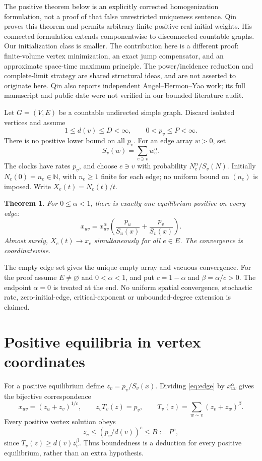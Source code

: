 \documentclass[11pt,a4paper]{article}
\newtheorem{theorem}{Theorem}
\newcommand{\N}{\mathbb N}
\newcommand{\Tv}{T_v}
\begin{document}
The positive theorem below is an explicitly corrected homogenization
formulation, not a proof of that false unrestricted uniqueness sentence.
Qin~\cite[Theorem 1.1]{Qin} proves this theorem and permits arbitrary finite
positive real initial weights. His connected formulation extends componentwise
to disconnected countable graphs. Our initialization class is smaller.
The contribution here is a different proof: finite-volume vertex minimization,
an exact jump compensator, and an approximate space-time maximum principle.
The power/incidence reduction and complete-limit strategy are shared structural
ideas, and are not asserted to originate here. Qin also reports independent
Angel--Hermon--Yao work; its full manuscript and public date were not verified
in our bounded literature audit.

Let $G=(V,E)$ be a countable undirected simple graph. Discard isolated vertices
and assume
\[
 1\leq d(v)\leq D<\infty,\qquad 0<p_v\leq P<\infty.
\]
There is no positive lower bound on all $p_v$. For an edge array $w>0$, set
\[
 S_v(w)=\sum_{e\ni v}w_e^\alpha.
\]
The clocks have rates $p_v$, and choose $e\ni v$ with probability
$N_e^\alpha/S_v(N)$. Initially $N_e(0)=n_e\in\N$, with $n_e\geq1$ finite for
each edge; no uniform bound on $(n_e)$ is imposed. Write $X_e(t)=N_e(t)/t$.

\begin{theorem}\label{thm:main}
For $0\leq\alpha<1$, there is exactly one equilibrium positive on every edge:
\begin{equation}\label{eq:edge}
 x_{uv}=x_{uv}^{\alpha}
 \left(\frac{p_u}{S_u(x)}+\frac{p_v}{S_v(x)}\right).
\end{equation}
Almost surely, $X_e(t)\longrightarrow x_e$ simultaneously for all $e\in E$.
The convergence is coordinatewise.
\end{theorem}

The empty edge set gives the unique empty array and vacuous convergence.
For the proof assume $E\ne\varnothing$ and $0<\alpha<1$, and put
$c=1-\alpha$ and $\beta=\alpha/c>0$. The endpoint $\alpha=0$ is treated at the
end. No uniform spatial convergence, stochastic rate, zero-initial-edge,
critical-exponent or unbounded-degree extension is claimed.

\section{Positive equilibria in vertex coordinates}

For a positive equilibrium define $z_v=p_v/S_v(x)$. Dividing
\eqref{eq:edge} by $x_{uv}^{\alpha}$ gives the bijective correspondence
\begin{equation}\label{eq:vertex}
 x_{uv}=(z_u+z_v)^{1/c},\qquad
 z_v\Tv(z)=p_v,\qquad
 \Tv(z)=\sum_{w\sim v}(z_v+z_w)^\beta.
\end{equation}
Every positive vertex solution obeys
\begin{equation}\label{eq:zupper}
 z_v\leq(p_v/d(v))^c\leq B:=P^c,
\end{equation}
since $\Tv(z)\geq d(v)z_v^\beta$. Thus boundedness is a deduction for every
positive equilibrium, rather than an extra hypothesis.
\end{document}
